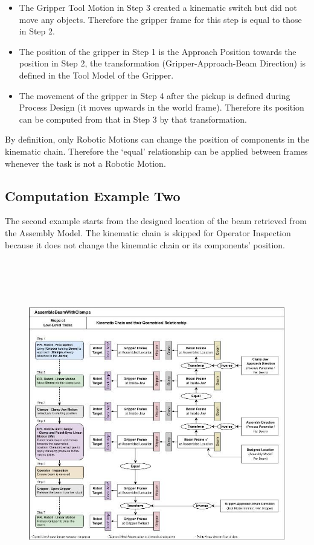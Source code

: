 \documentclass[11pt]{book}
\begin{document}
\begin{itemize}
	\item The Gripper Tool Motion in Step 3 created a kinematic switch but did not move any objects. Therefore the gripper frame for this step is equal to those in Step 2.

	\item The position of the gripper in Step 1 is the Approach Position towards the position in Step 2, the transformation (Gripper-Approach-Beam Direction) is defined in the Tool Model of the Gripper.

	\item The movement of the gripper in Step 4 after the pickup is defined during Process Design (it moves upwards in the world frame). Therefore its position can be computed from that in Step 3 by that transformation. 

\end{itemize}
By definition, only Robotic Motions can change the position of components in the kinematic chain. Therefore the ‘equal’ relationship can be applied between frames whenever the task is not a Robotic Motion.

\subsection{Computation Example Two}

The second example starts from the designed location of the beam retrieved from the Assembly Model. The kinematic chain is skipped for Operator Inspection because it does not change the kinematic chain or its components’ position.

\begin{figure}[H]
\includegraphics[width=15.92cm,height=14.43cm]{./images/image34.jpeg}
\end{figure}
\end{document}
